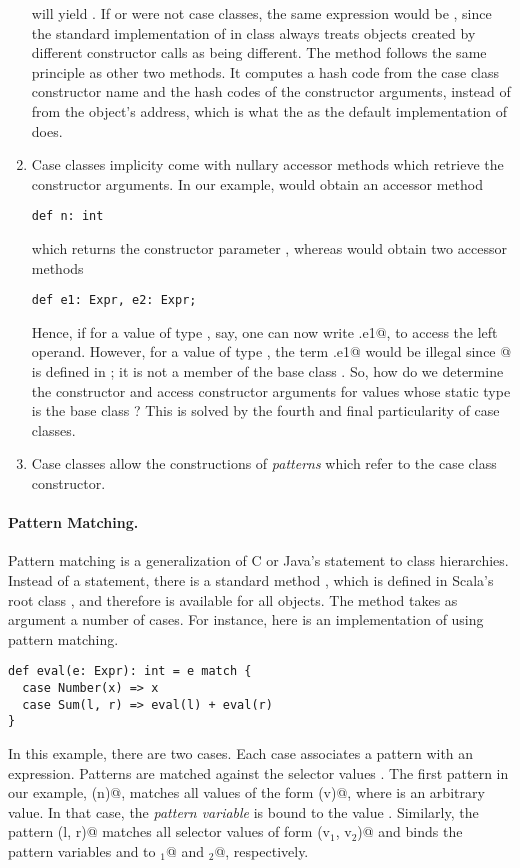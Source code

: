 \documentclass[11pt]{book}
\begin{document}
\begin{enumerate}
will yield \verb@true@. If \verb@Sum@ or \verb@Number@ were not case
classes, the same expression would be \verb@false@, since the standard
implementation of \verb@equals@ in class \verb@Object@ always treats
objects created by different constructor calls as being different.
The \verb@hashCode@ method follows the same principle as other two
methods. It computes a hash code from the case class constructor name
and the hash codes of the constructor arguments, instead of from the object's
address, which is what the as the default implementation of \verb@hashCode@ does.
\item 
Case classes implicity come with nullary accessor methods which
retrieve the constructor arguments.
In our example, \verb@Number@ would obtain an accessor method
\begin{verbatim}
def n: int
\end{verbatim}
which returns the constructor parameter \verb@n@, whereas \verb@Sum@ would obtain two accessor methods
\begin{verbatim}
def e1: Expr, e2: Expr;
\end{verbatim}
Hence, if for a value \verb@s@ of type \verb@Sum@, say, one can now
write \verb@s.e1@, to access the left operand. However, for a value
\verb@e@ of type \verb@Expr@, the term \verb@e.e1@ would be illegal
since @ is defined in \verb@Sum@; it is not a member of the
base class \verb@Expr@. 
So, how do we determine the constructor and access constructor
arguments for values whose static type is the base class \verb@Expr@?
This is solved by the fourth and final particularity of case classes.
\item 
Case classes allow the constructions of {\em patterns} which refer to
the case class constructor.
\end{enumerate}

\paragraph{Pattern Matching.}

Pattern matching is a generalization of C or Java's \verb@switch@
statement to class hierarchies. Instead of a \verb@switch@ statement,
there is a standard method \verb@match@, which is defined in Scala's
root class \verb@Any@, and therefore is available for all objects.
The \verb@match@ method takes as argument a number of cases. 
For instance, here is an implementation of \verb@eval@ using 
pattern matching.
\begin{verbatim}
def eval(e: Expr): int = e match { 
  case Number(x) => x 
  case Sum(l, r) => eval(l) + eval(r) 
}
\end{verbatim}
In this example, there are two cases. Each case associates a pattern
with an expression. Patterns are matched against the selector
values \verb@e@.  The first pattern in our example,
\verb@Number(n)@, matches all values of the form \verb@Number(v)@, 
where \verb@v@ is an arbitrary value.  In that case, the {\em pattern
variable} \verb@n@ is bound to the value \verb@v@. Similarly, the
pattern \verb@Sum(l, r)@ matches all selector values of form
\verb@Sum(v$_1$, v$_2$)@ and binds the pattern variables \verb@l@ and \verb@r@ 
to \verb@v$_1$@ and \verb@v$_2$@, respectively. 
\end{document}

